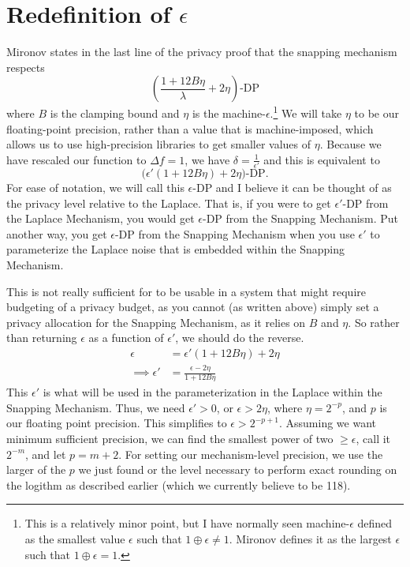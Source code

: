 \documentclass[11pt]{scrartcl} %
\begin{document}
\section{Redefinition of $\epsilon$}
Mironov states in the last line of the privacy proof that the snapping mechanism respects
\[ \left( \frac{1 + 12B\eta}{\lambda} + 2\eta \right)\text{-DP} \]
where $B$ is the clamping bound and $\eta$ is the machine-$\epsilon$.\footnote{This is a relatively minor point, but I have normally seen machine-$\epsilon$ defined as the smallest value $\epsilon$ such that $1 \oplus \epsilon \neq 1$. Mironov defines it as the largest $\epsilon$ such that $1 \oplus \epsilon = 1$.} We will take $\eta$ to be our floating-point precision, rather than a value that is machine-imposed, which allows us to use high-precision libraries to get smaller values of $\eta$.
Because we have rescaled our function to $\Delta f = 1$, we have $\delta = \frac{1}{\epsilon'}$ and this is equivalent to
\[ \big( \epsilon'(1 + 12B\eta) + 2\eta \big)\text{-DP}. \]
For ease of notation, we will call this $\epsilon$-DP and I believe it can be thought of as the privacy level relative to the Laplace. That is, if you were to get $\epsilon'$-DP from the Laplace Mechanism, you would get $\epsilon$-DP from the Snapping Mechanism. Put another way, you get $\epsilon$-DP from the Snapping Mechanism when you use $\epsilon'$ to parameterize the Laplace noise that is embedded within the Snapping Mechanism. \newline

This is not really sufficient for to be usable in a system that might require budgeting of a privacy budget, as you cannot (as written above) simply set a privacy allocation for the Snapping Mechanism, as it relies on $B$ and $\eta$. So rather than returning $\epsilon$ as a function of $\epsilon'$, we should do the reverse.
\begin{align}
             \epsilon &= \epsilon'(1 + 12B\eta) + 2\eta \nonumber \\
    \implies \epsilon' &= \frac{\epsilon - 2\eta}{1 + 12B \eta} \nonumber
\end{align}
This $\epsilon'$ is what will be used in the parameterization in the Laplace within the Snapping Mechanism. Thus, we need $\epsilon' > 0$, or $\epsilon > 2\eta$, where $\eta = 2^{-p}$, and $p$ is our floating point precision. This simplifies to $\epsilon > 2^{-p+1}$. Assuming we want minimum sufficient precision, we can find the smallest power of two $\geq \epsilon$, call it $2^{-m}$, and let $p = m+2$. For setting our mechanism-level precision, we use the larger of the $p$ we just found or the level necessary to perform exact rounding on the logithm as described earlier (which we currently believe to be 118).
\end{document}
